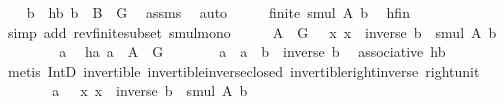 \begin{isabellebody}
\ \ \isamarkupfalse%
\ b\ \ hb{\isacharcolon}{\kern0pt}\ {\isachardoublequoteopen}b\ {\isasymin}\ B\ {\isasyminter}\ G{\isachardoublequoteclose}\ \isamarkupfalse%
\ assms\ \isamarkupfalse%
\ auto\isanewline
\ \ \isamarkupfalse%
\ \isamarkupfalse%
\ {\isachardoublequoteopen}finite\ {\isacharparenleft}{\kern0pt}smul\ A\ {\isacharbraceleft}{\kern0pt}b{\isacharbraceright}{\kern0pt}{\isacharparenright}{\kern0pt}{\isachardoublequoteclose}\ \isamarkupfalse%
\ hfin\ \isamarkupfalse%
\ {\isacharparenleft}{\kern0pt}simp\ add{\isacharcolon}{\kern0pt}\ rev{\isacharunderscore}{\kern0pt}finite{\isacharunderscore}{\kern0pt}subset\ smul{\isacharunderscore}{\kern0pt}mono{\isacharparenright}{\kern0pt}\isanewline
\ \ \isamarkupfalse%
\ \isamarkupfalse%
\ {\isachardoublequoteopen}A\ {\isasyminter}\ G\ {\isasymsubseteq}\ {\isacharparenleft}{\kern0pt}{\isasymlambda}\ x{\isachardot}{\kern0pt}\ x\ {\isasymcdot}\ inverse\ b{\isacharparenright}{\kern0pt}\ {\isacharbackquote}{\kern0pt}\ smul\ A\ {\isacharbraceleft}{\kern0pt}b{\isacharbraceright}{\kern0pt}{\isachardoublequoteclose}\isanewline
\ \ \isamarkupfalse%
\isanewline
\ \ \ \ \isamarkupfalse%
\ a\ \isamarkupfalse%
\ ha{\isacharcolon}{\kern0pt}\ {\isachardoublequoteopen}a\ {\isasymin}\ A\ {\isasyminter}\ G{\isachardoublequoteclose}\isanewline
\ \ \ \ \isamarkupfalse%
\ \isamarkupfalse%
\ {\isachardoublequoteopen}a\ {\isacharequal}{\kern0pt}\ {\isacharparenleft}{\kern0pt}a\ {\isasymcdot}\ b{\isacharparenright}{\kern0pt}\ {\isasymcdot}\ inverse\ b{\isachardoublequoteclose}\ \isamarkupfalse%
\ associative\ hb\isanewline
\ \ \ \ \ \ \isamarkupfalse%
\ {\isacharparenleft}{\kern0pt}metis\ IntD{}\ invertible\ invertible{\isacharunderscore}{\kern0pt}inverse{\isacharunderscore}{\kern0pt}closed\ invertible{\isacharunderscore}{\kern0pt}right{\isacharunderscore}{\kern0pt}inverse\ right{\isacharunderscore}{\kern0pt}unit{\isacharparenright}{\kern0pt}\isanewline
\ \ \ \ \isamarkupfalse%
\ \isamarkupfalse%
\ {\isachardoublequoteopen}a\ {\isasymin}\ {\isacharparenleft}{\kern0pt}{\isasymlambda}\ x{\isachardot}{\kern0pt}\ x\ {\isasymcdot}\ inverse\ b{\isacharparenright}{\kern0pt}\ {\isacharbackquote}{\kern0pt}\ smul\ A\ {\isacharbraceleft}{\kern0pt}b{\isacharbraceright}{\kern0pt}{\isachardoublequoteclose}\ \isamarkupfalse%

\end{isabellebody}
